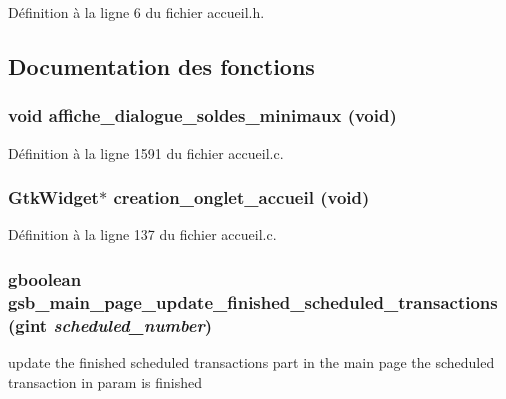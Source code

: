Définition à la ligne 6 du fichier accueil.h.



\subsection{Documentation des fonctions}
\subsubsection[{affiche\_\-dialogue\_\-soldes\_\-minimaux}]{\setlength{\rightskip}{0pt plus 5cm}void affiche\_\-dialogue\_\-soldes\_\-minimaux (void)}\label{accueil_8h_a14c0d85dd53f652a98e6a0ff81d9123b}


Définition à la ligne 1591 du fichier accueil.c.

\subsubsection[{creation\_\-onglet\_\-accueil}]{\setlength{\rightskip}{0pt plus 5cm}GtkWidget$\ast$ creation\_\-onglet\_\-accueil (void)}\label{accueil_8h_a31cb1d27d08c170361e63a0a7ef4ddb0}


Définition à la ligne 137 du fichier accueil.c.

\subsubsection[{gsb\_\-main\_\-page\_\-update\_\-finished\_\-scheduled\_\-transactions}]{\setlength{\rightskip}{0pt plus 5cm}gboolean gsb\_\-main\_\-page\_\-update\_\-finished\_\-scheduled\_\-transactions (gint {\em scheduled\_\-number})}\label{accueil_8h_a3b20e859b5870632529db167d03decfa}
update the finished scheduled transactions part in the main page the scheduled transaction in param is finished


